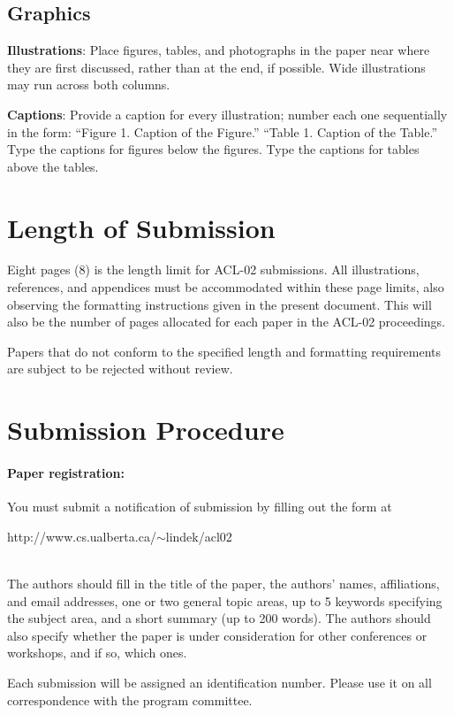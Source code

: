 \documentclass[11pt]{article}
\begin{document}
\subsection{Graphics}

{\bf Illustrations}: Place figures, tables, and photographs in the paper
near where they are first discussed, rather than at the end, if
possible.  Wide illustrations may run across both columns.

{\bf Captions}: Provide a caption for every illustration; number each one
sequentially in the form:  ``Figure 1. Caption of the Figure.'' ``Table 1.
Caption of the Table.''  Type the captions for figures below the
figures.  Type the captions for tables above the tables.


\section{Length of Submission}

Eight pages ($8$) is the length limit for ACL-02 submissions. All
illustrations, references, and appendices must be accommodated within
these page limits, also observing the formatting instructions given in
the present document. This will also be the number of pages allocated
for each paper in the ACL-02 proceedings.

Papers that do not conform to the specified length
and formatting requirements are subject to be rejected without
review.


\section{Submission Procedure}


\paragraph{Paper registration:} You must submit a notification of
submission by filling out the form at\\
\centerline{http://www.cs.ualberta.ca/$\sim$lindek/acl02}\\
The authors should fill in the title of the paper, the authors' names,
affiliations, and email addresses, one or two general topic areas, up
to 5 keywords specifying the subject area, and a short summary (up to
200 words).  The authors should also specify whether the paper is
under consideration for other conferences or workshops, and if so,
which ones.
  
Each submission will be assigned an identification number. Please use
it on all correspondence with the program committee.
  
\end{document}
